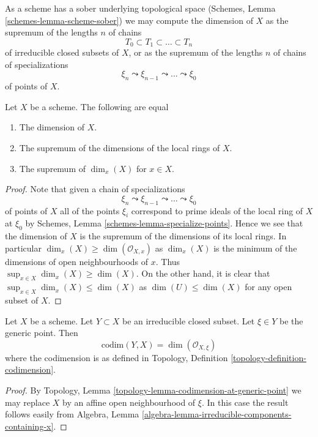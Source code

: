 \noindent
As a scheme has a sober underlying topological space
(Schemes, Lemma \ref{schemes-lemma-scheme-sober})
we may compute the dimension of $X$ as the supremum of the lengths $n$
of chains
$$
T_0 \subset T_1 \subset \ldots \subset T_n
$$
of irreducible closed subsets of $X$, or as the supremum of the lengths $n$
of chains of specializations
$$
\xi_n \leadsto \xi_{n - 1} \leadsto \ldots \leadsto \xi_0
$$
of points of $X$.

\begin{lemma}
\label{lemma-dimension}
Let $X$ be a scheme. The following are equal
\begin{enumerate}
\item The dimension of $X$.
\item The supremum of the dimensions of the local rings of $X$.
\item The supremum of $\dim_x(X)$ for $x \in X$.
\end{enumerate}
\end{lemma}

\begin{proof}
Note that given a chain of specializations
$$
\xi_n \leadsto \xi_{n - 1} \leadsto \ldots \leadsto \xi_0
$$
of points of $X$ all of the points $\xi_i$ correspond to prime ideals
of the local ring of $X$ at $\xi_0$ by
Schemes, Lemma \ref{schemes-lemma-specialize-points}.
Hence we see that the dimension of $X$ is the supremum of the dimensions
of its local rings. In particular $\dim_x(X) \geq \dim(\mathcal{O}_{X, x})$
as $\dim_x(X)$ is the minimum of the dimensions of open neighbourhoods of
$x$. Thus $\sup_{x \in X} \dim_x(X) \geq \dim(X)$. On the other hand,
it is clear that $\sup_{x \in X} \dim_x(X) \leq \dim(X)$
as $\dim(U) \leq \dim(X)$ for any open subset of $X$.
\end{proof}

\begin{lemma}
\label{lemma-codimension-local-ring}
Let $X$ be a scheme. Let $Y \subset X$ be an irreducible closed
subset. Let $\xi \in Y$ be the generic point. Then
$$
\text{codim}(Y, X) = \dim(\mathcal{O}_{X, \xi})
$$
where the codimension is as defined in
Topology, Definition \ref{topology-definition-codimension}.
\end{lemma}

\begin{proof}
By Topology, Lemma \ref{topology-lemma-codimension-at-generic-point}
we may replace $X$ by an affine open neighbourhood of $\xi$. In this
case the result follows easily from
Algebra, Lemma \ref{algebra-lemma-irreducible-components-containing-x}.
\end{proof}

